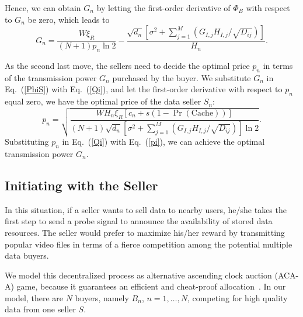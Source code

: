 \documentclass[11pt,draftcls]{IEEEtran}{\onecolumn}
\begin{document}
Hence, we can obtain $G_n$ by letting the first-order derivative of $\Phi_B$ with respect to $G_n$ be zero, which leads to
\begin{equation}\label{Qi}
{{G}_{n}}=\frac{W\xi_{R}}{(N+1){{p}_{n}}\ln 2}-\frac{\sqrt{{{d}_{n}}}\left[{{\sigma }^{2}}+\sum\limits_{j=1}^{M}\left({{G_{I,j}}H_{I,j}/\sqrt{{{D}_{ij}}}}\right)\right]}{H_{n}}.
\end{equation}

As the second last move, the sellers need to decide the optimal price $p_n$ in terms of the transmission power $G_n$ purchased by the buyer. We substitute $G_n$ in Eq.~(\ref{PhiS}) with Eq.~(\ref{Qi}), and let the first-order derivative with respect to $p_n$ equal zero, we have the optimal price of the data seller $S_{n}$:
\begin{equation}\label{pi}
p_n=\sqrt{\frac{WH_{n}\xi_R[c_n+s(1-\Pr(\textrm{Cache}))]}{(N+1)\sqrt{d_n}\left[\sigma^2+ \sum\limits_{j=1}^{M}\left({{G_{I,j}}H_{I,j}/\sqrt{{{D}_{ij}}}}\right)\right]\ln{2}}}.
\end{equation}
Substituting $p_n$ in Eq.~(\ref{Qi}) with Eq.~(\ref{pi}), we can achieve the optimal transmission power $G_n$.

\subsection{Initiating with the Seller}

In this situation, if a seller wants to sell data to nearby users, he/she takes the first step to send a probe signal to announce the availability of stored data resources. The seller would prefer to maximize his/her reward by transmitting popular video files in terms of a fierce competition among the potential multiple data buyers.

We model this decentralized process as alternative ascending clock auction (ACA-A) game, because it guarantees an efficient and cheat-proof allocation~\cite{chen2010spectrum}. In our model, there are $N$ buyers, namely $B_n$, $n=1,\ldots,N$, competing for high quality data from one seller $S$.
\end{document}

